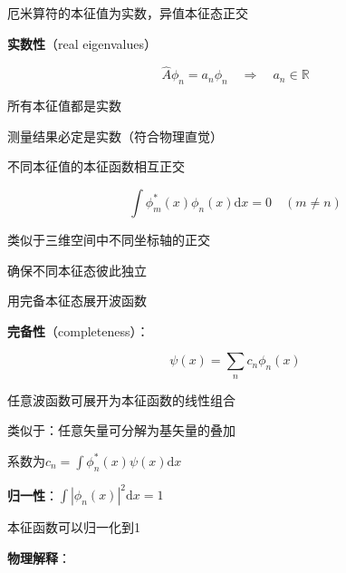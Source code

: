 \begin{frame}{厄米算符的本征值为实数，异值本征态正交}
  
    \begin{iqbitemize}
    \item \textbf{实数性}（real eigenvalues）
    \end{iqbitemize}
      \[
        \hat{A}\phi_n = a_n\phi_n \quad \Rightarrow \quad a_n \in \mathbb{R}
      \]
    \begin{iqbitemize}
    \item 所有本征值都是实数
    \item 测量结果必定是实数（符合物理直觉）
    \end{iqbitemize}
    \iqbtinysep

    \begin{iqbitemize}
    \item 不同本征值的本征函数相互正交
    \end{iqbitemize}
      \[
        \int \phi_m^*(x)\phi_n(x)\mathrm{d}x = 0 \quad (m \neq n)
      \]
    \begin{iqbitemize}
    \item 类似于三维空间中不同坐标轴的正交
    \item 确保不同本征态彼此独立
    \end{iqbitemize}
  
\end{frame}

\begin{frame}{用完备本征态展开波函数}
    \begin{iqbitemize}
    \item \textbf{完备性}（completeness）：
    \end{iqbitemize}
      \[
        \psi(x) = \sum_{n} c_n\phi_n(x)
      \]
    \begin{iqbitemize}
    \item 任意波函数可展开为本征函数的线性组合
    \item 类似于：任意矢量可分解为基矢量的叠加
    \item 系数为$c_n = \int \phi_n^*(x)\psi(x)\mathrm{d}x$
    \end{iqbitemize}
    \iqbsmallsep

    \begin{iqbitemize}
    \item \textbf{归一性}：$\int |\phi_n(x)|^2\mathrm{d}x = 1$
    \item 本征函数可以归一化到1
    \item \textbf{物理解释}：
    \end{iqbitemize}
    \iqbtinysep

  

\end{frame}

